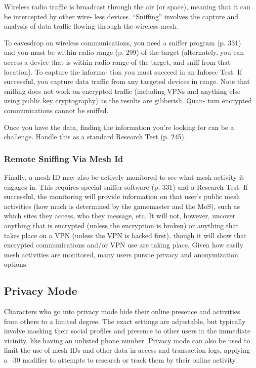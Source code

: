 Wireless radio traffic is broadcast through the air (or 
space), meaning that it can be intercepted by other wire-
less devices. ``Sniffing'' involves the capture and analysis 
of data traffic flowing through the wireless mesh.

To eavesdrop on wireless communications, you need 
a sniffer program (p. 331) and you must be within 
radio range (p. 299) of the target (alternately, you can 
access a device that is within radio range of the target, 
and sniff from that location). To capture the informa-
tion you must succeed in an Infosec Test. If successful, 
you capture data traffic from any targeted devices in 
range. Note that sniffing does not work on encrypted 
traffic (including VPNs and anything else using public 
key cryptography) as the results are gibberish. Quan-
tum encrypted communications cannot be sniffed.

Once you have the data, finding the information 
you're looking for can be a challenge. Handle this as 
a standard Research Test (p. 245).

\subsubsection{Remote Sniffing Via Mesh Id}

Finally, a mesh ID may also be actively monitored 
to see what mesh activity it engages in. This requires 
special sniffer software (p. 331) and a Research Test. 
If successful, the monitoring will provide information 
on that user's public mesh activities (how much is 
determined by the gamemaster and the MoS), such 
as which sites they access, who they message, etc. It 
will not, however, uncover anything that is encrypted 
(unless the encryption is broken) or anything that 
takes place on a VPN (unless the VPN is hacked first), 
though it will show that encrypted communications 
and/or VPN use are taking place.
Given how easily mesh activities are monitored, many 
users pursue privacy and anonymization options.

\subsection{Privacy Mode}

Characters who go into privacy mode hide their online 
presence and activities from others to a limited degree. 
The exact settings are adjustable, but typically involve 
masking their social profiles and presence to other 
users in the immediate vicinity, like having an unlisted 
phone number. Privacy mode can also be used to limit 
the use of mesh IDs and other data in access and 
transaction logs, applying a –30 modifier to attempts 
to research or track them by their online activity.

